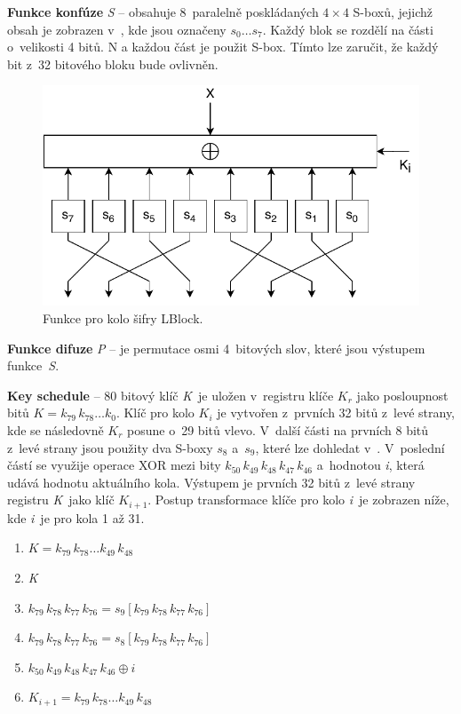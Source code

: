 \noindent \textbf{Funkce konfúze} \textit{S} -- obsahuje 8~paralelně poskládaných $4 \times 4$ S-boxů, jejichž obsah je zobrazen v~, kde jsou označeny $s_0\dots s_7$. Každý blok se rozdělí na části o~velikosti 4 bitů. N
a každou část je použit S-box. Tímto lze zaručit, že každý bit z~32 bitového bloku bude ovlivněn.\cite{LBlock}
\begin{figure}[!h]
  \begin{center}
    \includegraphics[scale=0.8]{obrazky/RoundLBLOCK.pdf}
  \end{center}
  \caption[Funkce pro kolo šifry LBlock]{Funkce pro kolo šifry LBlock.\cite{LBlock}}
  \label{img:roundLblock}
\end{figure}

\noindent \textbf{Funkce difuze} \textit{P} -- je permutace osmi 4~bitových slov, které jsou výstupem funkce~\textit{S}.

\noindent \textbf{Key schedule} -- 80 bitový klíč \textit{K}~je uložen v~registru klíče $K_r$ jako posloupnost bitů $K = k_{79}\,k_{78}\dots k_{0}$. Klíč pro kolo $K_i$ je vytvořen z~prvních 32 bitů z~levé strany, kde se následovně $K_r$ posune o~29 bitů vlevo. V~další části na prvních 8 bitů z~levé strany jsou použity dva S-boxy $s_8$ a~$s_9$, které lze dohledat v~. V~poslední částí se využije operace XOR mezi bity $k_{50}\,k_{49}\,k_{48}\,k_{47}\,k_{46}$ a~hodnotou \textit{i}, která udává hodnotu aktuálního kola. Výstupem je prvních 32 bitů z~levé strany registru \textit{K}~jako klíč $K_{i+1}$. Postup transformace klíče pro kolo \textit{i}~je zobrazen níže, kde \textit{i}~je pro kola 1 až 31.\cite{LBlock}
\begin{enumerate}[label=(\Alph*)]
    \item $K = k_{79}\,k_{78}\dots k_{49}\,k_{48}$
    \item \textit{K} 
    \item $k_{79}\,k_{78}\,k_{77}\,k_{76} = s_9 [k_{79}\,k_{78}\,k_{77}\,k_{76}]$
    \item $k_{79}\,k_{78}\,k_{77}\,k_{76} = s_8 [k_{79}\,k_{78}\,k_{77}\,k_{76}]$
    \item $k_{50}\,k_{49}\,k_{48}\,k_{47}\,k_{46} \oplus i$ 
    \item $K_{i+1} = k_{79}\,k_{78}\dots k_{49}\,k_{48}$
\end{enumerate}


